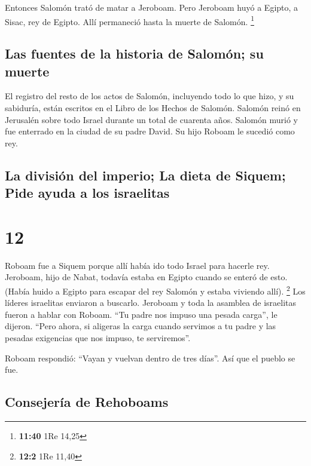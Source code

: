  Entonces Salomón trató de matar a Jeroboam. Pero
Jeroboam huyó a Egipto, a Sisac, rey de Egipto. Allí permaneció hasta la
muerte de Salomón. \footnote{\textbf{11:40} 1Re 14,25}

\hypertarget{las-fuentes-de-la-historia-de-salomuxf3n-su-muerte}{%
\subsection{Las fuentes de la historia de Salomón; su
muerte}\label{las-fuentes-de-la-historia-de-salomuxf3n-su-muerte}}

 El registro del resto de los actos de Salomón,
incluyendo todo lo que hizo, y su sabiduría, están escritos en el Libro
de los Hechos de Salomón.  Salomón reinó en Jerusalén
sobre todo Israel durante un total de cuarenta años. 
Salomón murió y fue enterrado en la ciudad de su padre David. Su hijo
Roboam le sucedió como rey.

\hypertarget{la-divisiuxf3n-del-imperio-la-dieta-de-siquem-pide-ayuda-a-los-israelitas}{%
\subsection{La división del imperio; La dieta de Siquem; Pide ayuda a
los
israelitas}\label{la-divisiuxf3n-del-imperio-la-dieta-de-siquem-pide-ayuda-a-los-israelitas}}

\hypertarget{section-11}{%
\section{12}\label{section-11}}

 Roboam fue a Siquem porque allí había ido todo Israel
para hacerle rey.  Jeroboam, hijo de Nabat, todavía estaba
en Egipto cuando se enteró de esto. (Había huido a Egipto para escapar
del rey Salomón y estaba viviendo allí). \footnote{\textbf{12:2} 1Re
  11,40}  Los líderes israelitas enviaron a buscarlo.
Jeroboam y toda la asamblea de israelitas fueron a hablar con Roboam.
 ``Tu padre nos impuso una pesada carga'', le dijeron.
``Pero ahora, si aligeras la carga cuando servimos a tu padre y las
pesadas exigencias que nos impuso, te serviremos''.

 Roboam respondió: ``Vayan y vuelvan dentro de tres
días''. Así que el pueblo se fue.

\hypertarget{consejeruxeda-de-rehoboams}{%
\subsection{Consejería de Rehoboams}\label{consejeruxeda-de-rehoboams}}

